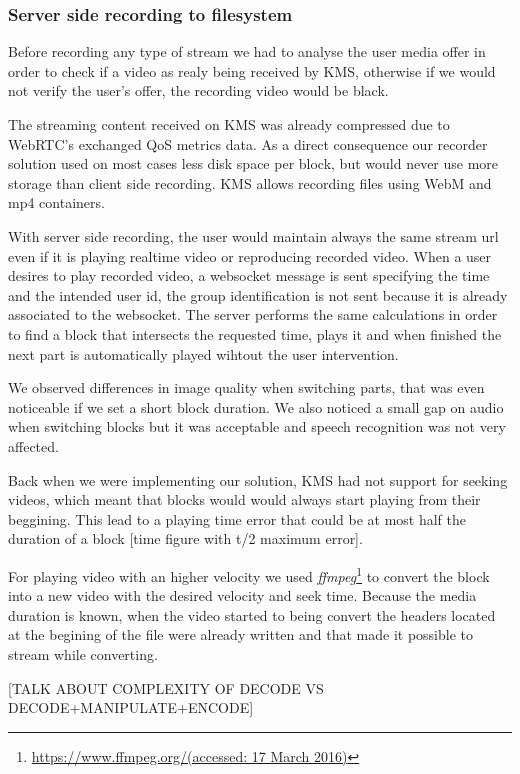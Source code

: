 \subsubsection{Server side recording to filesystem}

	Before recording any type of stream we had to analyse the user media offer in order to check if a video as realy being received by \ac{KMS}, otherwise if we would not verify the user's offer, the recording video would be black.

	The streaming content received on \ac{KMS} was already compressed due to \ac{WebRTC}'s exchanged \ac{QoS} metrics data. As a direct consequence our recorder solution used on most cases less disk space per block, but would never use more storage than client side recording. \ac{KMS} allows recording files using \ac{WebM} and \ac{mp4} containers.

	With server side recording, the user would maintain always the same stream url even if it is playing realtime video or reproducing recorded video. When a user desires to play recorded video, a websocket message is sent specifying the time and the intended user id, the group identification is not sent because it is already associated to the websocket. The server performs the same calculations in order to find a block that intersects the requested time, plays it and when finished the next part is automatically played wihtout the user intervention.

	We observed differences in image quality when switching parts, that was even noticeable if we set a short block duration. We also noticed a small gap on audio when switching blocks but it was acceptable and speech recognition was not very affected. 

	Back when we were implementing our solution, \ac{KMS} had not support for seeking videos, which meant that blocks would would always start playing from their beggining. This lead to a playing time error that could be at most half the duration of a block {\color{red}[time figure with t/2 maximum error]}. 

	For playing video with an higher velocity we used \emph{ffmpeg}\footnote{\url{https://www.ffmpeg.org/(accessed: 17 March 2016)}} to convert the block into a new video with the desired velocity and seek time. Because the media duration is known, when the video started to being convert the headers located at the begining of the file were already written and that made it possible to stream while converting.

	{\color{red} [TALK ABOUT COMPLEXITY OF DECODE VS DECODE+MANIPULATE+ENCODE]}

